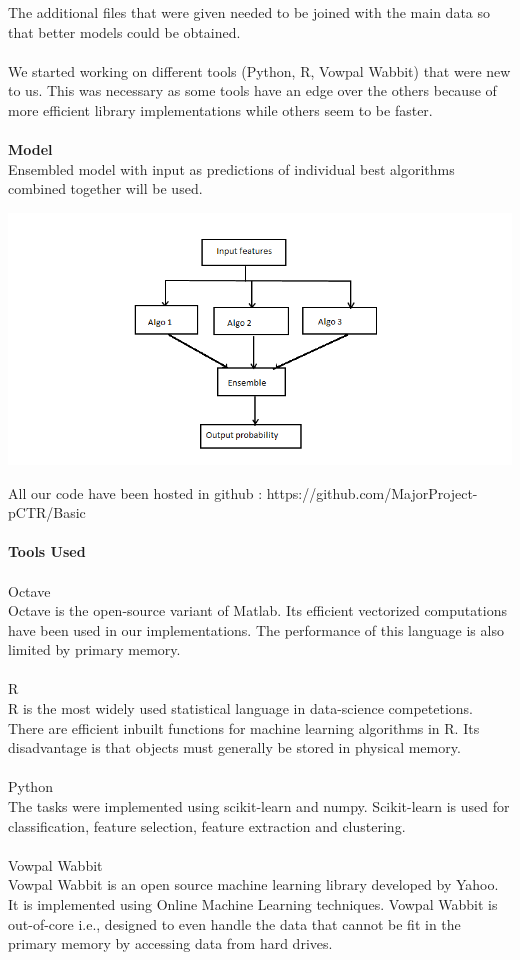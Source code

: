 \documentclass[10pt]{article}
\begin{document}
The additional files that were given needed to be joined with the main data so that better models could be obtained. \\\\
We started working on different tools (Python, R, Vowpal Wabbit) that were new to us. This was necessary as some tools have an edge over the others because of more efficient library implementations while others seem to be faster. \\\\
\textbf{Model}\\
Ensembled model with input as predictions of individual best algorithms combined together will be used. 
\begin{center}
\includegraphics[scale=0.5]{flowchart}
\end{center}
All our code have been hosted in github : https://github.com/MajorProject-pCTR/Basic \\\\
\textbf{Tools Used}\\\\
Octave \\
Octave is the open-source variant of Matlab. Its efficient vectorized computations have been used in our implementations. The performance of this language is also limited by primary memory. \\\\
R \\
R is the most widely used statistical language in data-science competetions. There are efficient inbuilt functions for machine learning algorithms in R. Its disadvantage is that objects must generally be stored in physical memory. \\\\
Python \\
The tasks were implemented using scikit-learn and numpy. Scikit-learn is used for classification, feature selection, feature extraction and clustering. \\\\
Vowpal Wabbit \\
Vowpal Wabbit is an open source machine learning library developed by Yahoo. It is implemented using Online Machine Learning techniques. Vowpal Wabbit is out-of-core i.e., designed to even handle the data that cannot be fit in the primary memory by accessing data from hard drives. \\\\
\end{document}
